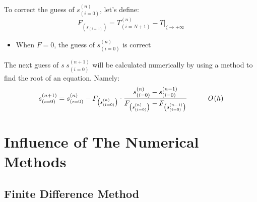 \documentclass[11pt, a4paper]{article}
\begin{document}
To correct the guess of $s_{(i=0)}^{(n)}$, let's define:
\begin{equation}
    F_{\left(s_{(i=0)}\right)}=T^{(n)}_{(i=N+1)}-\left.T\right|_{\zeta\rightarrow+\infty}
\end{equation}
\begin{itemize}
    \item When $F=0$, the guess of $s_{(i=0)}^{(n)}$ is correct
\end{itemize}
The next guess of \emph{s} $s_{(i=0)}^{(n+1)}$ will be calculated numerically by using a method to find the root of an equation. Namely:
\begin{equation}
    s_{(i=0)}^{(n+1)}=s_{(i=0)}^{(n)}-F_{\left(s_{(i=0)}^{(n)}\right)}\cdot\frac{s_{(i=0)}^{(n)}-s_{(i=0)}^{(n-1)}}{F_{\left(s_{(i=0)}^{(n)}\right)}-F_{\left(s_{(i=0)}^{(n-1)}\right)}} \hspace{1cm}\emph{O}\left(h\right)
\end{equation}

\section{Influence of The Numerical Methods}
\label{sec: Influence of The Numerical Methods}
\subsection{Finite Difference Method}
\end{document}
